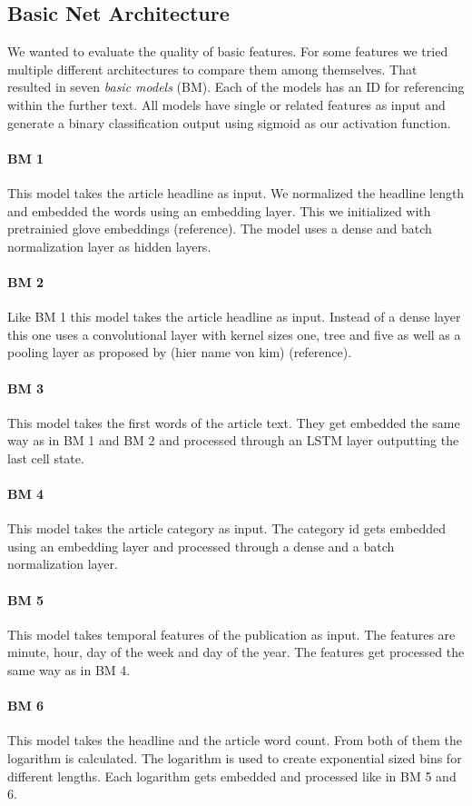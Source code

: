 \subsection{Basic Net Architecture}

We wanted to evaluate the quality of basic features. For some features we tried multiple different architectures to compare them among themselves. That resulted in seven \textit{basic models} (BM). Each of the models has an ID for referencing within the further text.
All models have single or related features as input and generate a binary classification output using sigmoid as our activation function.

\paragraph{BM 1} This model takes the article headline as input. We normalized the headline length and embedded the words using an embedding layer. This we initialized with pretrainied glove embeddings (reference). The model uses a dense and batch normalization layer as hidden layers.
\paragraph{BM 2} Like BM 1 this model takes the article headline as input. Instead of a dense layer this one uses a convolutional layer with kernel sizes one, tree and five as well as a pooling layer as proposed by (hier name von kim) (reference).
\paragraph{BM 3} This model takes the first words of the article text. They get embedded the same way as in BM 1 and BM 2 and processed through an LSTM layer outputting the last cell state.
\paragraph{BM 4} This model takes the article category as input. The category id gets embedded using an embedding layer and processed through a dense and a batch normalization layer.
\paragraph{BM 5} This model takes temporal features of the publication as input. The features are minute, hour, day of the week and day of the year. The features get processed the same way as in BM 4.
\paragraph{BM 6} This model takes the headline and the article word count. From both of them the logarithm is calculated. The logarithm is used to create exponential sized bins for different lengths. Each logarithm gets embedded and processed like in BM 5 and 6.
